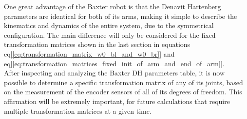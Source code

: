 \documentclass[11pt]{report} %
\begin{document}
\begin{table}[H]
\begin{center}
\caption{\label{tab:dh_params} Denavit Hartenberg Parameters for the arms of Baxter robot. Adapted from \citep{cite_denativ_hartenberg}.}
\end{center}
\end{table}

One great advantage of the Baxter robot is that the Denavit Hartenberg parameters are identical for both of its arms, making it simple to describe the kinematics and dynamics of the entire system, due to the symmetrical configuration. The main difference will only be considered for the fixed transformation matrices shown in the last section in equations eq[\ref{eq:transformation_matrix_w0_bl_and_w0_br}] and eq[\ref{eq:transformation_matrices_fixed_init_of_arm_and_end_of_arm}].\\

After inspecting and analyzing the Baxter DH parameters table, it is now possible to determine a specific transformation matrix of any of its joints, based on the measurement of the encoder sensors of all of its degrees of freedom. This affirmation will be extremely important, for future calculations that require multiple transformation matrices at a given time.\\ 
\end{document}
